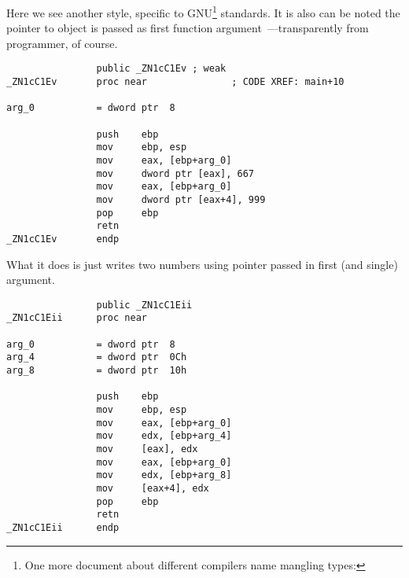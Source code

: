 {Here we see another  style, specific to GNU\footnote{One more document about different compilers name mangling types: \URLAGNER} standards. It is also can be noted the pointer to object is passed as first function 
argument~---transparently from programmer, of course.}


\begin{lstlisting}
                public _ZN1cC1Ev ; weak
_ZN1cC1Ev       proc near               ; CODE XREF: main+10

arg_0           = dword ptr  8

                push    ebp
                mov     ebp, esp
                mov     eax, [ebp+arg_0]
                mov     dword ptr [eax], 667
                mov     eax, [ebp+arg_0]
                mov     dword ptr [eax+4], 999
                pop     ebp
                retn
_ZN1cC1Ev       endp
\end{lstlisting}

{What it does is just writes two numbers using pointer passed in first (and single) argument.}


\begin{lstlisting}
                public _ZN1cC1Eii
_ZN1cC1Eii      proc near

arg_0           = dword ptr  8
arg_4           = dword ptr  0Ch
arg_8           = dword ptr  10h

                push    ebp
                mov     ebp, esp
                mov     eax, [ebp+arg_0]
                mov     edx, [ebp+arg_4]
                mov     [eax], edx
                mov     eax, [ebp+arg_0]
                mov     edx, [ebp+arg_8]
                mov     [eax+4], edx
                pop     ebp
                retn
_ZN1cC1Eii      endp
\end{lstlisting}


